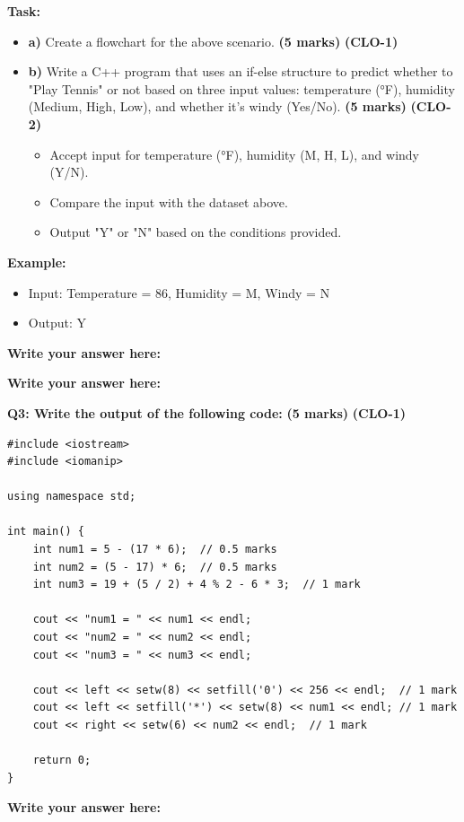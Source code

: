 \documentclass[a4paper,12pt]{article}
\begin{document}
\textbf{Task:}
\begin{itemize}
    \item \textbf{a)} Create a flowchart for the above scenario. \hfill \textbf{(5 marks)} \textbf{(CLO-1)}
    \item \textbf{b)} Write a C++ program that uses an if-else structure to predict whether to "Play Tennis" or not based on three input values: temperature (°F), humidity (Medium, High, Low), and whether it's windy (Yes/No). \hfill \textbf{(5 marks)} \textbf{(CLO-2)}
    \begin{itemize}
        \item Accept input for temperature (°F), humidity (M, H, L), and windy (Y/N).
        \item Compare the input with the dataset above.
        \item Output "Y" or "N" based on the conditions provided.
    \end{itemize}
\end{itemize}

\textbf{Example:}
\begin{itemize}
    \item Input: Temperature = 86, Humidity = M, Windy = N
    \item Output: Y
\end{itemize}

\vspace{0.5cm}
\textbf{Write your answer here:}
\begin{tcolorbox}[colframe=black, colback=white, width=\textwidth, height=10cm, valign=center]
\end{tcolorbox}


\vspace{0.5cm}
\textbf{Write your answer here:}
\begin{tcolorbox}[colframe=black, colback=white, width=\textwidth, height=23cm, valign=center]
\end{tcolorbox}
\vspace{0.5cm}
\textbf{Q3: Write the output of the following code:} \hfill \textbf{(5 marks)} \textbf{(CLO-1)}

\begin{verbatim}
#include <iostream>
#include <iomanip>

using namespace std;

int main() {
    int num1 = 5 - (17 * 6);  // 0.5 marks
    int num2 = (5 - 17) * 6;  // 0.5 marks
    int num3 = 19 + (5 / 2) + 4 % 2 - 6 * 3;  // 1 mark

    cout << "num1 = " << num1 << endl;
    cout << "num2 = " << num2 << endl;
    cout << "num3 = " << num3 << endl;

    cout << left << setw(8) << setfill('0') << 256 << endl;  // 1 mark
    cout << left << setfill('*') << setw(8) << num1 << endl; // 1 mark
    cout << right << setw(6) << num2 << endl;  // 1 mark

    return 0;
}
\end{verbatim}

\vspace{0.5cm}
\textbf{Write your answer here:}
\begin{tcolorbox}[colframe=black, colback=white, width=\textwidth, height=6cm, valign=center]
\end{tcolorbox}

\vspace{0.5cm}
\end{document}
